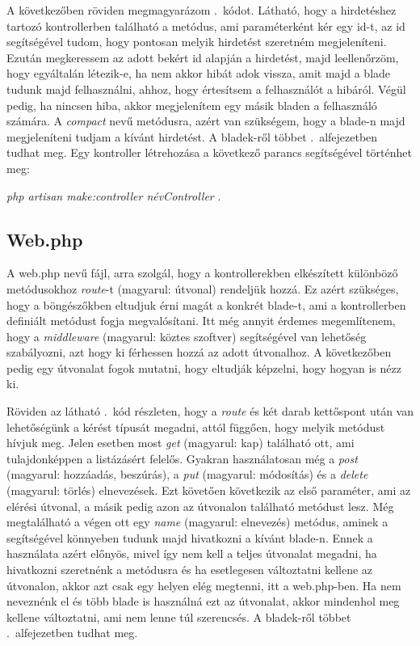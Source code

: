 \documentclass[]{thesis-ekf}
\theoremstyle{definition}
\theoremstyle{remark}
\begin{document}
			A következőben röviden megmagyarázom .~kódot. Látható, hogy a hirdetéshez tartozó kontrollerben található a metódus, ami paraméterként kér egy id-t, az id segítségével tudom, hogy pontosan melyik hirdetést szeretném megjeleníteni. Ezután megkeressem az adott bekért id alapján a hirdetést, majd leellenőrzöm, hogy egyáltalán létezik-e, ha nem akkor hibát adok vissza, amit majd a blade tudunk majd felhasználni, ahhoz, hogy értesítsem a felhasználót a hibáról. Végül pedig, ha nincsen hiba, akkor megjelenítem egy másik bladen a felhasználó számára. A \emph{compact} nevű metódusra, azért van szükségem, hogy a blade-n majd megjeleníteni tudjam a kívánt hirdetést. A bladek-ről többet .~alfejezetben tudhat meg.  Egy kontroller létrehozása a következő parancs segítségével történhet meg:
		\begin{center} 
			\emph{php artisan make:controller névController} .
		\end{center}
		  
	\subsection{Web.php}
		A web.php nevű fájl, arra szolgál, hogy a kontrollerekben elkészített különböző metódusokhoz \emph{route}-t (magyarul: útvonal) rendeljük hozzá. Ez azért szükséges, hogy a böngészőkben eltudjuk érni magát a konkrét blade-t, ami a kontrollerben definiált metódust fogja megvalósítani. Itt még annyit érdemes megemlítenem, hogy a \emph{middleware} (magyarul: köztes szoftver) segítségével van lehetőség szabályozni, azt hogy ki férhessen hozzá az adott útvonalhoz. A következőben pedig egy útvonalat fogok mutatni, hogy eltudják képzelni, hogy hogyan is nézz ki.
	
		
	
		Röviden az látható .~kód részleten, hogy a \emph{route} és két darab kettőspont után van lehetőségünk a kérést típusát megadni, attól függően, hogy melyik metódust hívjuk meg. Jelen esetben most \emph{get} (magyarul: kap) található ott, ami tulajdonképpen a listázásért felelős. Gyakran használatosan még a \emph{post} (magyarul: hozzáadás, beszúrás), a \emph{put} (magyarul: módosítás) és a \emph{delete} (magyarul: törlés) elnevezések. Ezt követően következik az első paraméter, ami az elérési útvonal, a másik pedig azon az útvonalon található metódust lesz. Még megtalálható a végen ott egy \emph{name} (magyarul: elnevezés) metódus, aminek a segítségével könnyeben tudunk majd hivatkozni a kívánt blade-n. Ennek a használata azért előnyös, mivel így nem kell a teljes útvonalat megadni, ha hivatkozni szeretnénk a metódusra és ha esetlegesen változtatni kellene az útvonalon, akkor azt csak egy helyen elég megtenni, itt a web.php-ben. Ha nem neveznénk el és több blade is használná ezt az útvonalat, akkor mindenhol meg kellene változtatni, ami nem lenne túl szerencsés. A bladek-ről többet .~alfejezetben tudhat meg.
		
\end{document}
